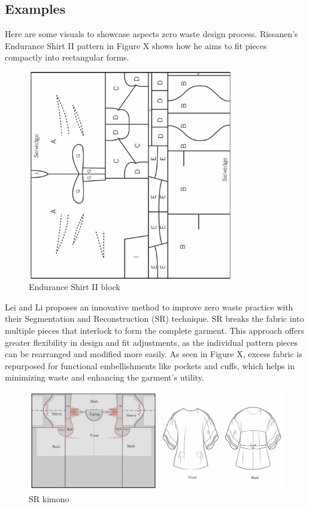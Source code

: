 \subsection{Examples}
Here are some visuals to showcase aspects zero waste design process. Rissanen's Endurance Shirt II pattern in Figure X shows how he aims to fit pieces compactly into rectangular forms.
\begin{figure} [H]
    \centering
    \includegraphics[width=0.8\textwidth]{Images/endurance shirt ii.png}
    \caption{Endurance Shirt II block}
\end{figure}
Lei and Li proposes an innovative method to improve zero waste practice with their Segmentation and Reconstruction (SR) technique. SR breaks the fabric into multiple pieces that interlock to form the complete garment. This approach offers greater flexibility in design and fit adjustments, as the individual pattern pieces can be rearranged and modified more easily. As seen in Figure X, excess fabric is repurposed for functional embellishments like pockets and cuffs, which helps in minimizing waste and enhancing the garment’s utility.
\begin{figure} [H]
    \centering
    \includegraphics[width=\textwidth]{Images/SR kimono.png}
    \caption{SR kimono}
\end{figure}

